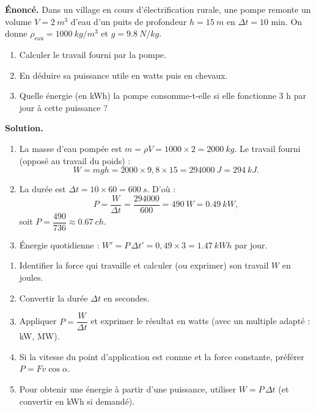 \documentclass[11pt]{article}
\begin{document}
\begin{exoresolu}
\textbf{Énoncé.} Dans un village en cours d'électrification rurale, une pompe remonte un volume $V = \SI{2}{m^3}$ d'eau d'un puits de profondeur $h = \SI{15}{m}$ en $\Delta t = 10$ min. On donne $\rho_{\text{eau}} = \SI{1000}{kg/m^3}$ et $g = \SI{9,8}{N/kg}$.
\begin{enumerate}
\item Calculer le travail fourni par la pompe.
\item En déduire sa puissance utile en watts puis en chevaux.
\item Quelle énergie (en kWh) la pompe consomme-t-elle si elle fonctionne 3 h par jour à cette puissance ?
\end{enumerate}
\tcblower
\textbf{Solution.}
\begin{enumerate}
\item La masse d'eau pompée est $m = \rho V = 1000 \times 2 = \SI{2000}{kg}$. Le travail fourni (opposé au travail du poids) :
\[ W = mgh = 2000 \times 9{,}8 \times 15 = \SI{294000}{J} = \SI{294}{kJ}. \]
\item La durée est $\Delta t = 10 \times 60 = \SI{600}{s}$. D'où :
\[ P = \dfrac{W}{\Delta t} = \dfrac{294000}{600} = \SI{490}{W} = \SI{0,49}{kW}, \]
soit $P = \dfrac{490}{736} \approx \SI{0,67}{ch}$.
\item Énergie quotidienne : $W' = P\,\Delta t' = 0{,}49 \times 3 = \SI{1,47}{kWh}$ par jour.
\end{enumerate}
\end{exoresolu}

\begin{methode}
\begin{enumerate}
\item Identifier la force qui travaille et calculer (ou exprimer) son travail $W$ en joules.
\item Convertir la durée $\Delta t$ en secondes.
\item Appliquer $P = \dfrac{W}{\Delta t}$ et exprimer le résultat en watts (avec un multiple adapté : kW, MW).
\item Si la vitesse du point d'application est connue et la force constante, préférer $P = Fv\cos\alpha$.
\item Pour obtenir une énergie à partir d'une puissance, utiliser $W = P\,\Delta t$ (et convertir en kWh si demandé).
\end{enumerate}
\end{methode}
\end{document}
